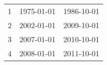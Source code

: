 % 
\begin{tabular}{ccc}
  \hline
  \hline
1 & 1975-01-01 & 1986-10-01 \\ 
  2 & 2002-01-01 & 2009-10-01 \\ 
  3 & 2007-01-01 & 2010-10-01 \\ 
  4 & 2008-01-01 & 2011-10-01 \\ 
   \hline
\end{tabular}
